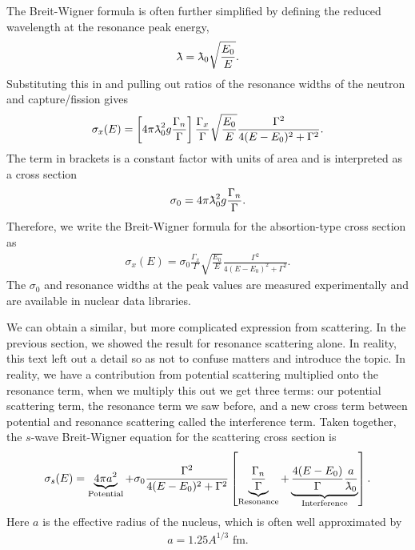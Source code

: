 The Breit-Wigner formula is often further simplified by defining the reduced wavelength at the resonance peak energy,
\begin{align}
  \lambdabar = \lambdabar_0 \sqrt{ \frac{E_0}{E} } .
\end{align}
Substituting this in and pulling out ratios of the resonance widths of the neutron and capture/fission gives
\begin{align} 
  \sigma_x(E) = \left[ 4 \pi \lambdabar^2_0 g \frac{\Gamma_n}{\Gamma} \right] \frac{\Gamma_x}{\Gamma}  \sqrt{ \frac{E_0}{E} } \frac{ \Gamma^2 }{ 4 ( E - E_0 )^2 + \Gamma^2 } .
\end{align}
The term in brackets is a constant factor with units of area and is interpreted as a cross section
\begin{align}
  \sigma_0 = 4 \pi \lambdabar^2_0 g \frac{\Gamma_n}{\Gamma} . \label{Eq:nuclearData_resonancePeakCrossSection}
\end{align}
Therefore, we write the Breit-Wigner formula for the absortion-type cross section as
\begin{align} \label{Eq:nuclearData_breitWignerAbsorptionXS}
  \sigma_x(E) = \sigma_0 \frac{\Gamma_x}{\Gamma}  \sqrt{ \frac{E_0}{E} } \frac{ \Gamma^2 }{ 4 ( E - E_0 )^2 + \Gamma^2 } .
\end{align}
The $\sigma_0$ and resonance widths at the peak values are measured experimentally and are available in nuclear data libraries.

We can obtain a similar, but more complicated expression from scattering. In the previous section, we showed the result for resonance scattering alone. In reality, this text left out a detail so as not to confuse matters and introduce the topic. In reality, we have a contribution from potential scattering multiplied onto the resonance term, when we multiply this out we get three terms: our potential scattering term, the resonance term we saw before, and a new cross term between potential and resonance scattering called the interference term. Taken together, the $s$-wave Breit-Wigner equation for the scattering cross section is
\begin{align} \label{Eq:nuclearData_breitWignerElasticXS}
  \sigma_s(E) = \underbrace{4 \pi a^2}_\text{Potential} + \sigma_0  \frac{ \Gamma^2 }{ 4 ( E - E_0 )^2 + \Gamma^2 } \left[ \underbrace{\frac{\Gamma_n}{\Gamma}}_\text{Resonance} + \underbrace{\frac{ 4 ( E - E_0 ) }{\Gamma} \frac{a}{\lambdabar_0}}_\text{Interference} \right] .
\end{align}
Here $a$ is the effective radius of the nucleus, which is often well approximated by
\begin{align}
  a = 1.25 A^{1/3} \text{ fm}. \nonumber
\end{align}

